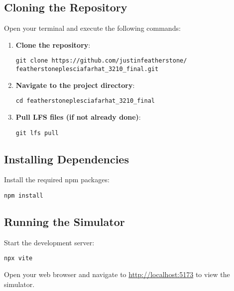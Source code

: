 \documentclass[12pt, a4paper]{article}
\begin{document}
\subsection{Cloning the Repository}

Open your terminal and execute the following commands:

\begin{enumerate}
    \item \textbf{Clone the repository}:

          \begin{verbatim}
git clone https://github.com/justinfeatherstone/
featherstoneplesciafarhat_3210_final.git
    \end{verbatim}

    \item \textbf{Navigate to the project directory}:

          \begin{verbatim}
cd featherstoneplesciafarhat_3210_final
    \end{verbatim}

    \item \textbf{Pull LFS files (if not already done)}:

          \begin{verbatim}
git lfs pull
    \end{verbatim}

\end{enumerate}

\subsection{Installing Dependencies}

Install the required npm packages:

\begin{verbatim}
npm install
\end{verbatim}

\newpage

\subsection{Running the Simulator}

Start the development server:

\begin{verbatim}
npx vite
\end{verbatim}

Open your web browser and navigate to \url{http://localhost:5173} to view the
simulator.
\end{document}
